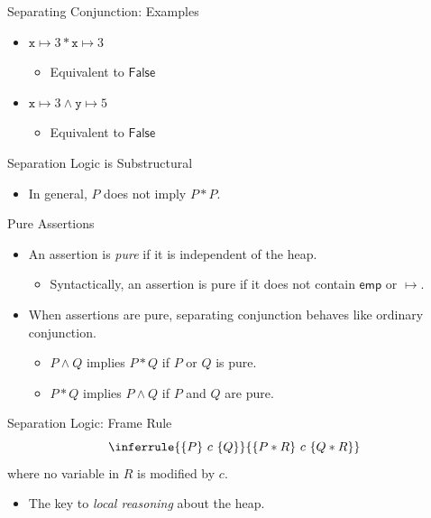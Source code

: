 \documentclass{beamer}
\begin{document}
\begin{frame}{Separating Conjunction: Examples}
  \begin{itemize}
    \item $\texttt{x}\mapsto3*\texttt{x}\mapsto3$
      \begin{itemize}
        \item Equivalent to $\mathsf{False}$
      \end{itemize}
    \item $\texttt{x}\mapsto3\land\texttt{y}\mapsto5$
      \begin{itemize}
        \item Equivalent to $\mathsf{False}$
      \end{itemize}
  \end{itemize}
\end{frame}

\begin{frame}{Separation Logic is Substructural}
  \begin{itemize}
    \item In general, $P$ does not imply $P*P$.
  \end{itemize}
\end{frame}

\begin{frame}{Pure Assertions}
  \begin{itemize}
    \item An assertion is \emph{pure} if it is independent of the heap.
      \begin{itemize}
        \item Syntactically, an assertion is pure if it does not contain
          $\mathsf{emp}$ or $\mapsto$.
      \end{itemize}
    \item When assertions are pure, separating conjunction behaves like ordinary conjunction.
      \begin{itemize}
        \item $P\land Q$ implies $P*Q$ if $P$ or $Q$ is pure.
        \item $P*Q$ implies $P\land Q$ if $P$ and $Q$ are pure.
      \end{itemize}
  \end{itemize}
\end{frame}

\begin{frame}{Separation Logic: Frame Rule}
  \[
    \inferrule{\{P\}\ c\ \{Q\}}
              {\{P*R\}\ c\ \{Q*R\}}
  \]
  where no variable in $R$ is modified by $c$.

  \begin{itemize}
    \item The key to \emph{local reasoning} about the heap.
  \end{itemize}
\end{frame}
\end{document}
